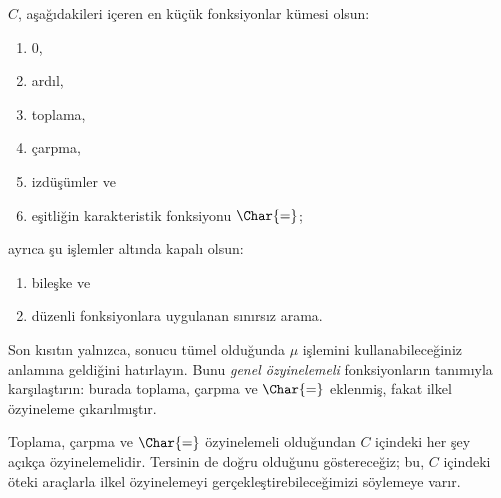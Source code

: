 


$C$, aşağıdakileri içeren en küçük fonksiyonlar kümesi olsun:
\begin{enumerate}
\item $0$,
\item ardıl,
\item toplama,
\item çarpma,
\item izdüşümler ve
\item eşitliğin karakteristik fonksiyonu $\Char{=}$;
\end{enumerate}
ayrıca şu işlemler altında kapalı olsun:
\begin{enumerate}
\item bileşke ve
\item düzenli fonksiyonlara uygulanan sınırsız arama.
\end{enumerate}
Son kısıtın yalnızca, sonucu tümel olduğunda $\mu$ işlemini
kullanabileceğiniz anlamına geldiğini hatırlayın. Bunu \emph{genel
özyinelemeli} fonksiyonların tanımıyla karşılaştırın: burada toplama,
çarpma ve $\Char{=}$ eklenmiş, fakat ilkel özyineleme çıkarılmıştır.

Toplama, çarpma ve $\Char{=}$ özyinelemeli olduğundan $C$ içindeki her şey
açıkça özyinelemelidir. Tersinin de doğru olduğunu göstereceğiz; bu, $C$
içindeki öteki araçlarla ilkel özyinelemeyi gerçekleştirebileceğimizi
söylemeye varır.

